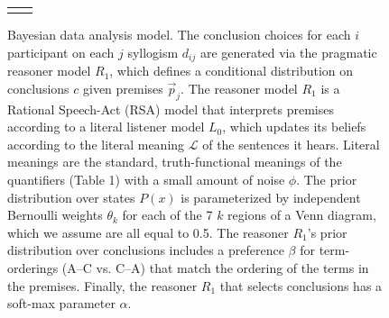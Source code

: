 \documentclass[floatsintext, doc]{apa6}
\begin{document}
\begin{figure}[ht!]
\begin{center}
\begin{tabular}{cc}
\begin{tikzpicture}
%


\end{tikzpicture}

    \end{tabular}
  \end{center}
  \caption{\small Bayesian data analysis model. The conclusion choices for each $i$ participant on each $j$ syllogism $d_{ij}$ are generated via the pragmatic reasoner model $R_1$, which defines a conditional distribution on conclusions $c$ given premises $\vec{p}_j$. The reasoner model $R_1$ is a Rational Speech-Act (RSA) model that interprets premises according to a literal listener model $L_0$, which updates its beliefs according to the literal meaning $\mathcal{L}$ of the sentences it hears. Literal meanings are the standard, truth-functional meanings of the quantifiers (Table 1\label{tab:sem}) with a small amount of noise $\phi$. The prior distribution over states $P(x)$ is parameterized by independent Bernoulli weights $\theta_k$ for each of the 7 $k$ regions of a Venn diagram, which we assume are all equal to 0.5. The reasoner $R_1$'s prior distribution over conclusions includes a preference $\beta$ for term-orderings (A--C vs. C--A) that match the ordering of the terms in the premises. Finally, the reasoner $R_1$ that selects conclusions has a soft-max parameter $\alpha$.}
  \label{fig:bayesnet}
\end{figure}
\end{document}
